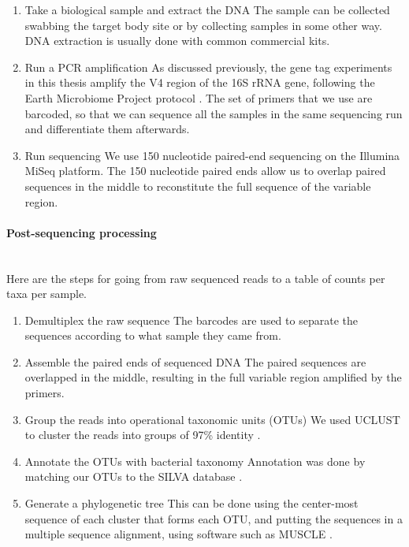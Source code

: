 \begin{enumerate}
\item Take a biological sample and extract the DNA
The sample can be collected swabbing the target body site or by collecting samples in some other way. DNA extraction is usually done with common commercial kits.

\item Run a PCR amplification
As discussed previously, the gene tag experiments in this thesis amplify the V4 region of the 16S rRNA gene, following the Earth Microbiome Project protocol \cite{caporaso2012ultra}. The set of primers that we use are barcoded, so that we can sequence all the samples in the same sequencing run and differentiate them afterwards.

\item Run sequencing
We use 150 nucleotide paired-end sequencing on the Illumina MiSeq platform. The 150 nucleotide paired ends allow us to overlap paired sequences in the middle to reconstitute the full sequence of the variable region.
\end{enumerate}

\paragraph{Post-sequencing processing}\mbox{}\\
Here are the steps for going from raw sequenced reads to a table of counts per taxa per sample.
\begin{enumerate}
\item Demultiplex the raw sequence
The barcodes are used to separate the sequences according to what sample they came from.

\item Assemble the paired ends of sequenced DNA
The paired sequences are overlapped in the middle, resulting in the full variable region amplified by the primers.

\item Group the reads into operational taxonomic units (OTUs)
We used UCLUST to cluster the reads into groups of 97\% identity \cite{edgar2010search}.

\item Annotate the OTUs with bacterial taxonomy
Annotation was done by  matching our OTUs to the SILVA database \cite{quast2013silva}.

\item Generate a phylogenetic tree
This can be done using the center-most sequence of each cluster that forms each OTU, and putting the sequences in a multiple sequence alignment, using software such as MUSCLE \cite{edgar2004muscle}.
\end{enumerate}


